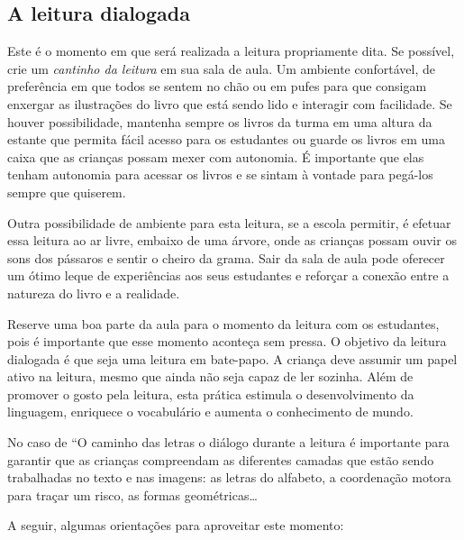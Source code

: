 \documentclass[11pt]{extarticle}
\begin{document}
\subsection{A leitura dialogada}
Este é o momento em que será realizada a leitura propriamente dita. 
Se possível, crie um \textit{cantinho da leitura} em sua sala de aula. Um 
ambiente confortável, de preferência em que todos se sentem no chão ou 
em pufes para que consigam enxergar as ilustrações do livro que está 
sendo lido e interagir com facilidade. Se houver possibilidade, mantenha 
sempre os livros da turma em uma altura da estante que permita fácil 
acesso para os estudantes ou guarde os livros em uma caixa que as crianças 
possam mexer com autonomia. É importante que elas tenham autonomia para 
acessar os livros e se sintam à vontade para pegá-los sempre que quiserem. 

Outra possibilidade de ambiente para esta leitura, se a escola permitir, 
é efetuar essa leitura ao ar livre, embaixo de uma árvore, onde as crianças 
possam ouvir os sons dos pássaros e sentir o cheiro da grama. Sair da sala 
de aula pode oferecer um ótimo leque de experiências aos seus estudantes e 
reforçar a conexão entre a natureza do livro e a realidade.  

Reserve uma boa parte da aula para o momento da leitura com os estudantes, 
pois é importante que esse momento aconteça sem pressa. O objetivo da 
leitura dialogada é que seja uma leitura em bate-papo. A criança deve 
assumir um papel ativo na leitura, mesmo que ainda não seja capaz de 
ler sozinha. Além de promover o gosto pela leitura, esta prática estimula 
o desenvolvimento da linguagem, enriquece o vocabulário e 
aumenta o conhecimento de mundo.

No caso de ``O caminho das letras o diálogo durante a leitura é 
importante para garantir que as crianças compreendam as diferentes
camadas que estão sendo trabalhadas no texto e nas imagens: 
as letras do alfabeto, a coordenação motora para traçar um risco, 
as formas geométricas\dots{}

A seguir, algumas orientações para aproveitar este momento: 
\end{document}
